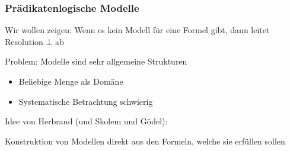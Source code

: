 \documentclass[aspectratio=1610,onlymath]{beamer}
\begin{document}
\egroup

\begin{frame}\frametitle{Prädikatenlogische Modelle}

Wir wollen zeigen: Wenn es kein Modell für eine Formel gibt, dann leitet Resolution $\bot$ ab\bigskip

\alert{Problem:} Modelle sind sehr allgemeine Strukturen
\begin{itemize}
\item Beliebige Menge als Domäne
\item Systematische Betrachtung schwierig
\end{itemize}\bigskip\pause

\alert{Idee von Herbrand (und Skolem und Gödel)}:
\begin{center}
{\Large{}}\medskip

Konstruktion von Modellen direkt aus den Formeln, welche sie erfüllen sollen
\end{center}

\end{frame}
\end{document}
